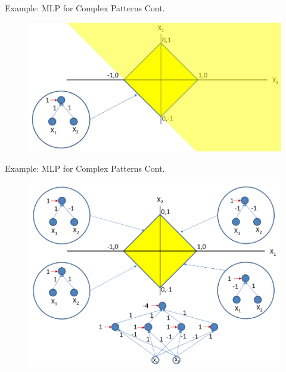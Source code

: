 \documentclass[serif, aspectratio=169]{beamer}
\begin{document}
\begin{frame}{Example: MLP for Complex Patterns Cont.}
        \begin{figure}[htpb]
        \begin{center}
            \includegraphics[keepaspectratio, scale=0.25]{pic/2/ex5.png}
        \end{center}
    \end{figure}
\end{frame}


\begin{frame}{Example: MLP for Complex Patterns Cont.}
        \begin{figure}[htpb]
        \begin{center}
            \includegraphics[keepaspectratio, scale=0.25]{pic/2/ex6.png}
        \end{center}
    \end{figure}
\end{frame}
\end{document}
